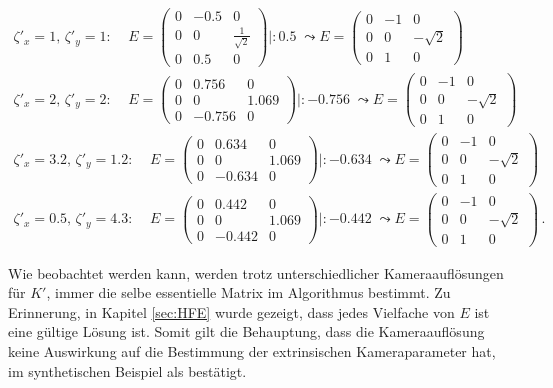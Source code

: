 \begin{gather*}
	\zeta'_x = 1, \, \zeta'_y = 1: \; \; \;\;
	E = \begin{pmatrix}
		0&-0.5&0\\
		0&0&\frac{1}{\sqrt{2}}\\
		0&0.5&0
	\end{pmatrix} |: 0.5 \; \leadsto
	E = \begin{pmatrix}
		0&-1&0\\
		0&0&-\sqrt{2}\\
		0&1&0
	\end{pmatrix}\\
	\zeta'_x = 2, \, \zeta'_y = 2: \; \; \;\;
	E = \begin{pmatrix}
		0&0.756&0\\
		0&0&1.069\\
		0&-0.756&0
	\end{pmatrix} |: -0.756 \; \leadsto
	E = \begin{pmatrix}
		0&-1&0\\
		0&0&-\sqrt{2}\\
		0&1&0
	\end{pmatrix}\\
	\zeta'_x = 3.2, \, \zeta'_y = 1.2: \; \; \;\;
	E = \begin{pmatrix}
		0&0.634&0\\
		0&0&1.069\\
		0&-0.634&0
	\end{pmatrix} |: -0.634 \; \leadsto
	E = \begin{pmatrix}
		0&-1&0\\
		0&0&-\sqrt{2}\\
		0&1&0
	\end{pmatrix}\\
	\zeta'_x = 0.5, \, \zeta'_y = 4.3: \; \; \;\;
	E = \begin{pmatrix}
		0&0.442&0\\
		0&0&1.069\\
		0&-0.442&0
	\end{pmatrix} |: -0.442 \; \leadsto
	E = \begin{pmatrix}
		0&-1&0\\
		0&0&-\sqrt{2}\\
		0&1&0
	\end{pmatrix} \, . 
\end{gather*}

Wie beobachtet werden kann, werden trotz unterschiedlicher Kameraauflösungen für $K'$, immer die selbe essentielle Matrix im Algorithmus bestimmt. Zu Erinnerung, in Kapitel \ref{sec:HFE} wurde gezeigt, dass jedes Vielfache von $E$ ist eine gültige Lösung ist. Somit gilt die Behauptung, dass die Kameraauflösung keine Auswirkung auf die Bestimmung der extrinsischen Kameraparameter hat, im synthetischen Beispiel als bestätigt.
\pagebreak

